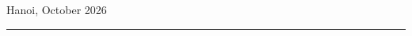 \begin{titlepage}
\begin{center}
        \vfill
        {\large Hanoi, October 2026\par}
        {\color{black!50}\rule{0.2\textwidth}{0.5pt}\par}
        \vspace{0.3cm}
        
        \vspace*{0.25cm}
    \end{center}
\end{titlepage}
